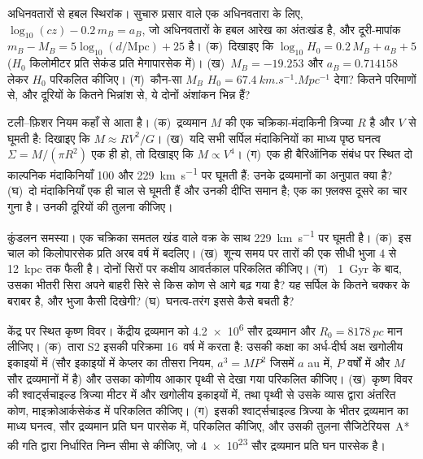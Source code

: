 \begin{exercise}[$\star\star$]\label{exo:b3:milky-way-galaxies:9}
अधिनवतारों से हबल स्थिरांक। सुचारु प्रसार वाले एक अधिनवतारा के लिए,
$\log_{10}(cz) - 0.2\,m_B = a_B$, जो अधिनवतारों के हबल आरेख का अंतःखंड है, और
दूरी-मापांक $m_B - M_B = 5\log_{10}(d/\mathrm{Mpc}) + 25$ है। (क)~दिखाइए
कि $\log_{10}H_0 = 0.2\,M_B + a_B + 5$ ($H_0$ किलोमीटर प्रति सेकंड
प्रति मेगापारसेक में)। (ख)~$M_B = -19.253$ और $a_B = 0.714158$ लेकर
$H_0$ परिकलित कीजिए। (ग)~कौन-सा $M_B$ $H_0 = \qty{67.4}{km.s^{-1}.Mpc^{-1}}$ देगा?
कितने परिमाणों से,
और दूरियों के कितने भिन्नांश से,
ये दोनों अंशांकन भिन्न हैं?
\end{exercise}

\begin{exercise}[$\star\star\star$]\label{exo:b3:milky-way-galaxies:10}
टली--फ़िशर नियम कहाँ से आता है। (क)~द्रव्यमान $M$ की एक चक्रिका-मंदाकिनी
त्रिज्या $R$ है और $V$ से घूमती है: दिखाइए कि $M \approx RV^2/G$। (ख)~यदि सभी
सर्पिल मंदाकिनियों का माध्य पृष्ठ घनत्व $\Sigma = M/(\pi R^2)$ एक ही हो,
तो दिखाइए कि $M \propto V^4$। (ग)~एक ही बैरिऑनिक संबंध पर स्थित दो काल्पनिक मंदाकिनियाँ
100 और \qty{229}{km.s^{-1}} पर घूमती हैं: उनके द्रव्यमानों का अनुपात क्या है?
(घ)~दो मंदाकिनियाँ एक ही चाल से घूमती हैं और उनकी दीप्ति समान है;
एक का फ़्लक्स दूसरे का चार गुना है। उनकी
दूरियों की तुलना कीजिए।
\end{exercise}

\begin{exercise}[$\star\star\star$]\label{exo:b3:milky-way-galaxies:11}
कुंडलन समस्या। एक चक्रिका समतल खंड वाले वक्र के साथ
\qty{229}{km.s^{-1}} पर घूमती है। (क)~इस चाल को किलोपारसेक प्रति
अरब वर्ष में बदलिए। (ख)~शून्य समय पर तारों की एक सीधी भुजा 4 से
\qty{12}{kpc} तक फैली है। दोनों सिरों पर कक्षीय आवर्तकाल परिकलित कीजिए। (ग)~
\qty{1}{Gyr} के बाद, उसका भीतरी सिरा अपने बाहरी सिरे से किस कोण से आगे बढ़ गया है?
यह सर्पिल के कितने चक्कर के बराबर है, और भुजा कैसी दिखेगी?
(घ)~घनत्व-तरंग इससे कैसे बचती है?
\end{exercise}

\begin{exercise}[$\star\star\star$]\label{exo:b3:milky-way-galaxies:12}
केंद्र पर स्थित कृष्ण विवर। केंद्रीय द्रव्यमान को
\num{4.2e6} सौर द्रव्यमान और $R_0 = \qty{8178}{pc}$ मान लीजिए। (क)~तारा S2
इसकी परिक्रमा \num{16}~वर्ष में करता है: उसकी कक्षा का अर्ध-दीर्घ अक्ष
खगोलीय इकाइयों में (सौर इकाइयों में केप्लर का तीसरा नियम, $a^3 = MP^2$ जिसमें
$a$ au में, $P$ वर्षों में और $M$ सौर द्रव्यमानों में है) और उसका कोणीय आकार
पृथ्वी से देखा गया परिकलित कीजिए। (ख)~कृष्ण विवर की श्वार्ट्सचाइल्ड त्रिज्या
मीटर में और खगोलीय इकाइयों में, तथा पृथ्वी से उसके व्यास द्वारा अंतरित कोण,
माइक्रोआर्कसेकंड में परिकलित कीजिए। (ग)~इसकी श्वार्ट्सचाइल्ड त्रिज्या के भीतर
द्रव्यमान का माध्य घनत्व, सौर द्रव्यमान प्रति घन
पारसेक में, परिकलित कीजिए, और उसकी तुलना सैजिटेरियस~A* की गति द्वारा निर्धारित
निम्न सीमा से कीजिए, जो \num{4e23} सौर द्रव्यमान प्रति घन पारसेक है।
\end{exercise}

